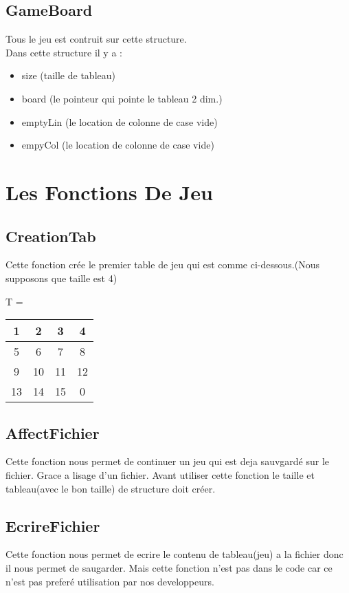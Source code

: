 \documentclass{article}
\begin{document}
\subsection{GameBoard}
Tous le jeu est contruit sur cette structure.
\\
Dans cette structure il y a : \\

\begin{itemize}
	\item size (taille de tableau)
	\item board (le pointeur qui pointe le tableau 2 dim.)
	\item emptyLin (le location de colonne de case vide)
	\item empyCol (le location de colonne de case vide)
\end{itemize}

\newpage

\section{Les Fonctions De Jeu}

\subsection{CreationTab}
Cette fonction crée le premier table de jeu qui est comme ci-dessous.(Nous supposons que taille est 4) \\

\begin{center}
	T =
	\begin{tabular}{|c|c|c|c|} \hline
	 1 & 2 & 3 & 4 \\  \hline
	 5 & 6 & 7 & 8 \\  \hline
	 9 & 10 & 11 & 12 \\ \hline
	13 & 14 & 15 & 0 \\ \hline
	\end{tabular}
\end{center}
 

\subsection{AffectFichier}
Cette fonction nous permet de continuer un jeu qui est deja sauvgardé sur le fichier. Grace a lisage d'un fichier. Avant utiliser cette fonction le taille et tableau(avec le bon taille) de structure doit créer.

\subsection{EcrireFichier}
Cette fonction nous permet de ecrire le contenu de tableau(jeu) a la fichier donc il nous permet de saugarder.
Mais cette fonction n'est pas dans le code car ce n'est pas preferé utilisation par nos developpeurs.
\end{document}
